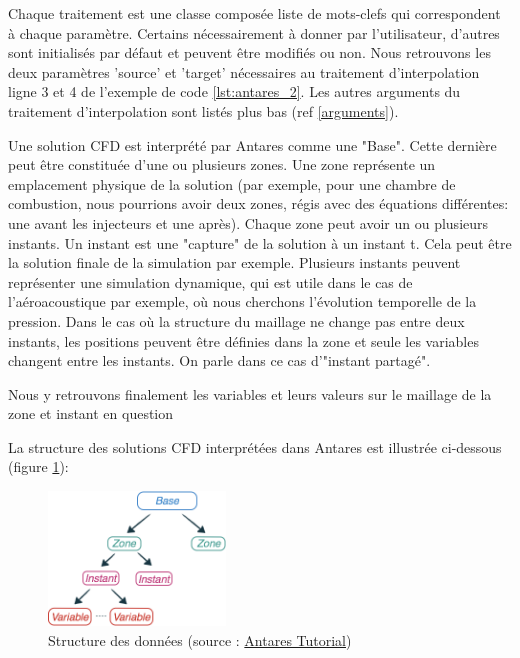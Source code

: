 Chaque traitement est une classe composée liste de mots-clefs qui correspondent à chaque paramètre. Certains nécessairement à donner par l'utilisateur, d'autres sont initialisés par défaut et peuvent être modifiés ou non. Nous retrouvons les deux paramètres 'source' et 'target' nécessaires au traitement d'interpolation ligne 3 et 4 de l'exemple de code \ref{lst:antares_2}. Les autres arguments du traitement d'interpolation sont listés plus bas (ref \ref{arguments}).


Une solution CFD est interprété par Antares comme une "Base".
Cette dernière peut être constituée d'une ou plusieurs zones.
Une zone représente un emplacement physique de la solution (par exemple, pour une chambre de combustion, nous pourrions avoir deux zones, régis avec des équations différentes: une avant les injecteurs et une après). %
Chaque zone peut avoir un ou plusieurs instants.
Un instant est une "capture" de la solution à un instant t. Cela peut être la solution finale de la simulation par exemple. Plusieurs instants peuvent représenter une simulation dynamique, qui est utile dans le cas de l'aéroacoustique par exemple, où nous cherchons l'évolution temporelle de la pression.
Dans le cas où la structure du maillage ne change pas entre deux instants, les positions peuvent être définies dans la zone et seule les variables changent entre les instants. On parle dans ce cas d'"instant partagé".\label{instants_partages}


Nous y retrouvons finalement les variables et leurs valeurs sur le maillage de la zone et instant en question


La structure des solutions CFD interprétées dans Antares est illustrée ci-dessous (figure \ref{fig:structure_antares}):

\begin{figure}[H]
\centering
\includegraphics[width=0.42\textwidth]{images/data_structure_1.png}
\caption{Structure des données (source : \href{https://cerfacs.fr/antares/src/tutorial/base.html}{Antares Tutorial})}
\label{fig:structure_antares}
\end{figure}

